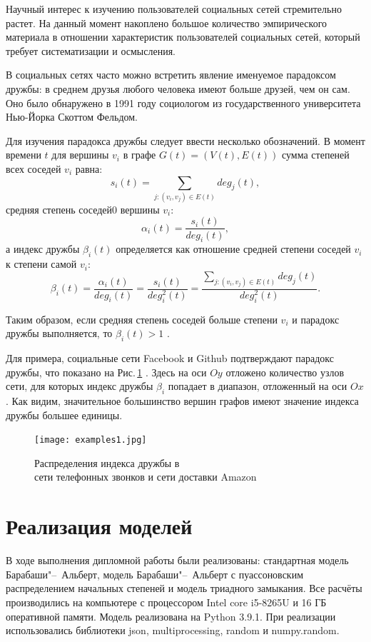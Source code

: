 \documentclass[bachelor, och, diploma]{SCWorks}
\begin{document}
Научный интерес к изучению пользователей социальных сетей стремительно растет. На данный момент накоплено большое количество эмпирического материала в отношении характеристик пользователей социальных сетей, который требует систематизации и осмысления.

В социальных сетях часто можно встретить явление именуемое парадоксом дружбы: в среднем друзья любого человека имеют больше друзей, чем он сам. Оно было обнаружено в 1991 году социологом из государственного университета Нью-Йорка Скоттом Фельдом\cite{aw}.

Для изучения парадокса дружбы следует ввести несколько обозначений. В момент времени $t$ для вершины $v_i$ в графе $G(t) = (V(t), E(t))$ сумма степеней всех соседей $v_i$ равна:
\[
s_i(t) = \sum_{j: (v_i, v_j ) \in E(t)} deg_j(t),
\]
средняя степень соседей0 вершины $ v_i $:
\[
\alpha_i(t) = \dfrac{s_i(t)}{deg_i(t)}, 
\]
а индекс дружбы $\beta_i(t)$ определяется как отношение средней степени соседей $v_i$ к степени самой $v_i$: 
\[
\beta_i(t) = \dfrac{\alpha_i(t)}{deg_i(t)} = \dfrac{s_i(t)}{deg_i^2 (t)} = \dfrac{\sum_{j: (v_i, v_j ) \in E(t)} deg_j(t)}{deg_i^2 (t)}.
\]

Таким образом, если средняя степень соседей больше степени $v_i$ и парадокс дружбы выполняется, то $\beta_i(t) > 1$ \cite{fi}.

Для примера, социальные сети Facebook и Github подтверждают парадокс дружбы, что показано на Рис.\,\ref{fig:img3} \cite{mir}.
Здесь на оси $ Oy $  отложено количество узлов сети, для которых индекс дружбы $ \beta_i $ попадает в диапазон, отложенный на оси $ Ox $. Как видим, значительное большинство вершин графов имеют значение индекса дружбы большее единицы.   
\begin{figure}[!ht]
    \centering
    \texttt{[image: examples1.jpg]}
    \caption{Распределения индекса дружбы в\\ сети телефонных звонков и сети доставки Amazon}\label{fig:img3}
\end{figure}

\section{Реализация моделей}
В ходе выполнения дипломной работы были реализованы: стандартная модель Барабаши"--~Альберт, модель Барабаши"--~Альберт с пуассоновским распределением начальных степеней и модель триадного замыкания. Все расчёты производились на компьютере с процессором Intel core i5-8265U и 16 ГБ оперативной памяти. Модель реализована на Python 3.9.1. При реализации использовались библиотеки json, multiprocessing, random и numpy.random.
\end{document}
